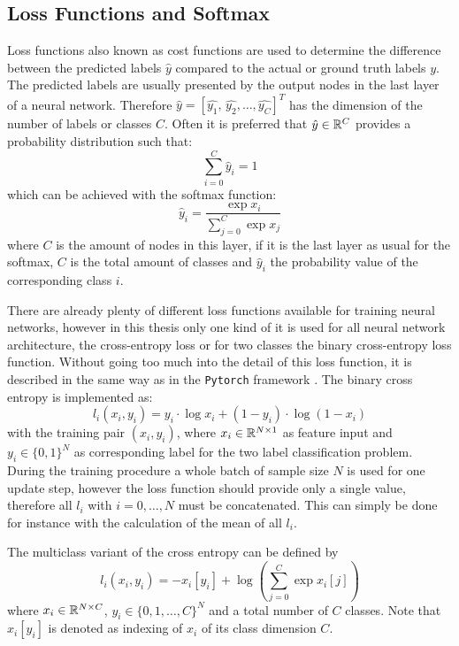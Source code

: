 
\subsection{Loss Functions and Softmax}
Loss functions also known as cost functions are used to determine the difference between the predicted labels $\hat{y}$ compared to the actual or ground truth labels $y$.
The predicted labels are usually presented by the output nodes in the last layer of a neural network.
Therefore $\hat{y} = [\hat{y_1}, \, \hat{y_2}, \dots, \hat{y_C}]^T$ has the dimension of the number of labels or classes $C$.
Often it is preferred that $\hat{y} \in \mathbb{R}^C$ provides a probability distribution such that:
\begin{equation}
  \sum_{i=0}^C \hat{y}_i = 1
\end{equation}
which can be achieved with the softmax function:
\begin{equation}\label{eq:nn_theory_softmax}
  \hat{y}_i = \frac{\exp{x_i}}{\sum_{j=0}^{C}\exp{x_j}}
\end{equation}
where $C$ is the amount of nodes in this layer, if it is the last layer as usual for the softmax, $C$ is the total amount of classes and $\hat{y}_i$ the probability value of the corresponding class $i$.

There are already plenty of different loss functions available for training neural networks, however in this thesis only one kind of it is used for all neural network architecture, the cross-entropy loss or for two classes the binary cross-entropy loss function.
Without going too much into the detail of this loss function, it is described in the same way as in the \texttt{Pytorch} framework \cite{Pytorch}.
The binary cross entropy is implemented as:
\begin{equation}
  l_i(x_i, y_i) = y_i \cdot \log x_i + (1 - y_i) \cdot \log (1 - x_i)
\end{equation}
with the training pair $(x_i, y_i)$, where $x_i \in \mathbb{R}^{N \times 1}$ as feature input and $y_i \in \{0, 1\}^N$ as corresponding label for the two label classification problem.
During the training procedure a whole batch of sample size $N$ is used for one update step, however the loss function should provide only a single value, therefore all $l_i$ with $i = 0, \dots, N$ must be concatenated.
This can simply be done for instance with the calculation of the mean of all $l_i$.

The multiclass variant of the cross entropy can be defined by
\begin{equation}
  l_i(x_i, y_i) = - x_i[y_i] + \log{\left( \sum_{j=0}^{C} \exp{x_i[j]} \right)}
\end{equation}
where $x_i \in \mathbb{R}^{N \times C}$, $y_i \in \{0, 1, \dots, C\}^N$ and a total number of $C$ classes.
Note that $x_i[y_i]$ is denoted as indexing of $x_i$ of its class dimension $C$. 


